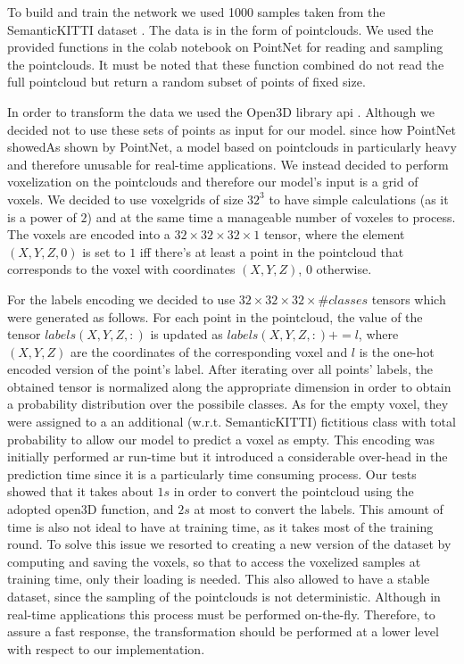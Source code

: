 To build and train the network we used 1000 samples taken from the SemanticKITTI dataset \cite{behley2019iccv}.
The data is in the form of pointclouds. We used the provided
functions in the colab notebook on PointNet for reading and sampling the pointclouds. It must be noted that these function combined
do not read the full pointcloud but return a random subset of points of fixed size.\par
In order to transform the data we used the Open3D library api \cite{zhou2018open3d}. 
Although we decided not to use these sets of points as input for our model. since how PointNet showedAs shown by PointNet,
a model based on pointclouds in particularly heavy and therefore unusable for real-time applications.
We instead decided to perform voxelization on the pointclouds and therefore our model's input is a grid of voxels.
We decided to use voxelgrids of size $32^3$ to have simple calculations (as it is a power of $2$) and at the same time a manageable number of voxeles to process.
The voxels are encoded into a $32\times32\times32\times1$ tensor, where the element $(X,Y,Z,0)$ is set to $1$ iff there's at least a point in the pointcloud that corresponds to the voxel with coordinates $(X,Y,Z)$, 0 otherwise.\par
For the labels encoding we decided to use $32\times32\times32\times\#classes$ tensors which were generated as follows.
For each point in the pointcloud, the value of the tensor 
$labels(X,Y,Z,:)$ is updated as $labels(X,Y,Z,:)+=l$, where $(X,Y,Z)$ are the coordinates of the corresponding voxel and $l$ is the one-hot encoded version
of the point's label.
After iterating over all points' labels, the obtained tensor is normalized along the appropriate dimension in order to obtain a probability distribution over the possibile classes. 
As for the empty voxel, they were assigned to a an additional (w.r.t. SemanticKITTI) fictitious class with total probability to 
allow our model to predict a voxel as empty.
This encoding was initially performed ar run-time but it introduced a considerable over-head in the prediction time since
it is a particularly time consuming process. Our tests showed that it takes about $1s$ in order to convert the pointcloud
using the adopted open3D function, and $2s$ at most to convert the labels. This amount of time
is also not ideal to have at training time, as it takes most of the training round. 
To solve this issue we resorted to creating a new version of the dataset by computing and saving the voxels, so that to access the voxelized samples
at training time, only their loading is needed. This also allowed to have a stable dataset, since the sampling of the pointclouds
is not deterministic. Although in real-time applications this process must be performed on-the-fly. Therefore, to assure a fast response,
the transformation should be performed at a lower level with respect to our implementation.